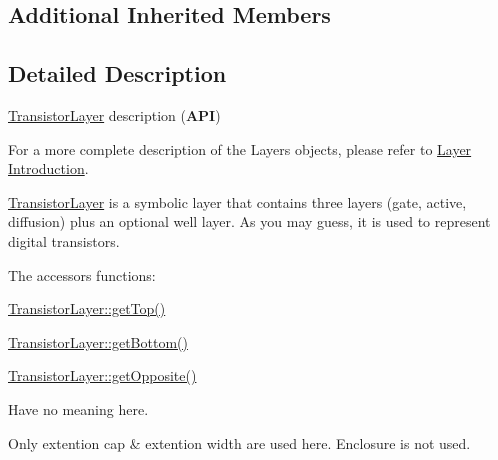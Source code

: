 \subsection*{Additional Inherited Members}


\subsection{Detailed Description}
\hyperlink{classHurricane_1_1TransistorLayer}{Transistor\-Layer} description ({\bfseries A\-P\-I}) 

For a more complete description of the Layers objects, please refer to \hyperlink{classHurricane_1_1Layer_secLayerIntro}{Layer Introduction}.

\hyperlink{classHurricane_1_1TransistorLayer}{Transistor\-Layer} is a symbolic layer that contains three layers (gate, active, diffusion) plus an optional well layer. As you may guess, it is used to represent digital transistors.

The accessors functions\-: 
\begin{DoxyItemize}
\item \hyperlink{classHurricane_1_1Layer_a00213c29884bfd396576c9cf2fb8ed59}{Transistor\-Layer\-::get\-Top()} 
\item \hyperlink{classHurricane_1_1Layer_a5398b082b8a441c13d5b54c3cefff685}{Transistor\-Layer\-::get\-Bottom()} 
\item \hyperlink{classHurricane_1_1Layer_a97d8901ab1e4598d0783aeb89f55421a}{Transistor\-Layer\-::get\-Opposite()} 
\end{DoxyItemize}Have no meaning here.

Only extention cap \& extention width are used here. Enclosure is not used. 

